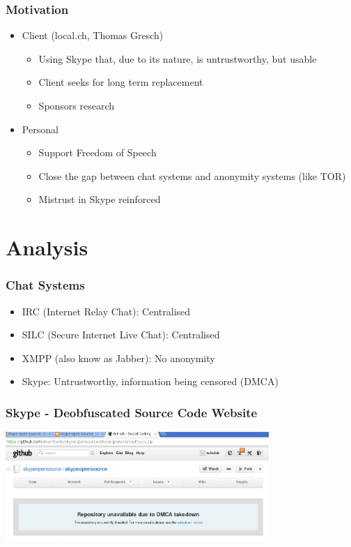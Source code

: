 \documentclass{beamer}
\begin{document}
\frame
{
  \frametitle{Motivation}
  \begin{itemize}
     \item Client (local.ch, Thomas Gresch)
     \begin{itemize}
        \item Using Skype that, due to its nature, is untrustworthy, but usable
        \item Client seeks for long term replacement 
        \item Sponsors research
    \end{itemize}
     \item Personal
     \begin{itemize}
        \item Support Freedom of Speech
        \item Close the gap between chat systems and anonymity systems (like TOR)
        \pause \item \alert{Mistrust in Skype reinforced}
    \end{itemize}
  \end{itemize}
}

\section{Analysis}
\frame
{
  \frametitle{Chat Systems}
  \begin{itemize}
          \item IRC (Internet Relay Chat): Centralised
          \item SILC (Secure Internet Live Chat): Centralised
          \item XMPP (also know as Jabber): No anonymity
          \item Skype: Untrustworthy, information being censored (DMCA)
   \end{itemize}
}

\frame
{
  \frametitle{Skype - Deobfuscated Source Code Website}
  
  \begin{center}
   \includegraphics[width=10cm]{dmca-skype.png}
  \end{center}
}
\end{document}
